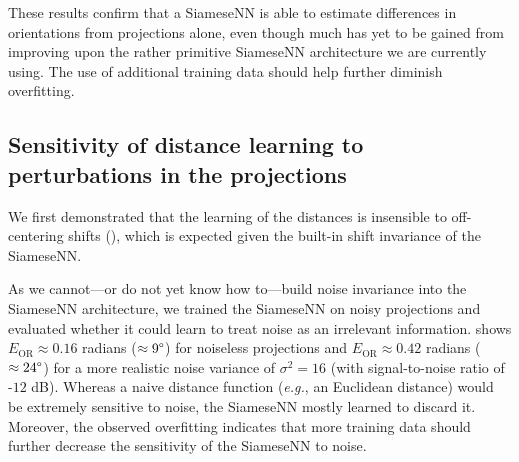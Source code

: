 These results confirm that a SiameseNN is able to estimate differences in orientations from projections alone, even though much has yet to be gained from improving upon the rather primitive SiameseNN architecture we are currently using.
The use of additional training data should help further diminish overfitting.


\subsection{Sensitivity of distance learning to perturbations in the projections}\label{sec:results:distance-estimation:sensitivity}


We first demonstrated that the learning of the distances is insensible to off-centering shifts (), which is expected given the built-in shift invariance of the SiameseNN. 

As we cannot---or do not yet know how to---build noise invariance into the SiameseNN architecture, we trained the SiameseNN on noisy projections and evaluated whether it could learn to treat noise as an irrelevant information.
 shows $E_\text{OR} \approx 0.16$ radians ($\approx 9\degree$) for noiseless projections and $E_\text{OR} \approx 0.42$ radians ($\approx 24\degree$) for a more realistic noise variance of $\sigma^2=16$ (with signal-to-noise ratio of -$12$ dB). 
Whereas a naive distance function (\textit{e.g.}, an Euclidean distance) would be extremely sensitive to noise, the SiameseNN mostly learned to discard it.
Moreover, the observed overfitting indicates that more training data should further decrease the sensitivity of the SiameseNN to noise.

